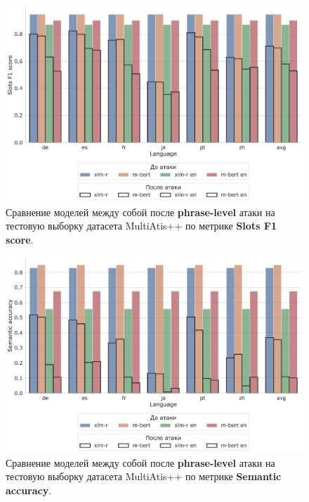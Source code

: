 \begin{figure}[H]
    \centering
    \includegraphics[width=\textwidth]{images/7}
    \caption{Сравнение моделей между собой после \textbf{phrase-level} атаки на тестовую выборку датасета MultiAtis++ по метрике \textbf{Slots F1 score}.}\label{fig:figure7}
\end{figure}
\begin{figure}[H]
    \centering
    \includegraphics[width=\textwidth]{images/8}
    \caption{Сравнение моделей между собой после \textbf{phrase-level} атаки на тестовую выборку датасета MultiAtis++ по метрике \textbf{Semantic accuracy}.}\label{fig:figure8}
\end{figure}

